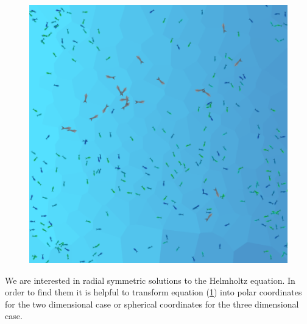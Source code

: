 \documentclass[a4paper,11pt]{article}
\theoremstyle{definition}
\numberwithin{equation}{section}
\begin{document}
	\begin{figure}
		\centering
		\includegraphics[width=1\textwidth]{pictures/wator.png}
		\label{fig:helmholtz}
	\end{figure}
	
	We are interested in radial symmetric solutions to the Helmholtz equation. In order to find them it is helpful to transform equation (\ref{fig:helmholtz}) into polar coordinates for the two dimensional case or spherical coordinates for the three dimensional case. 
	
\end{document}
